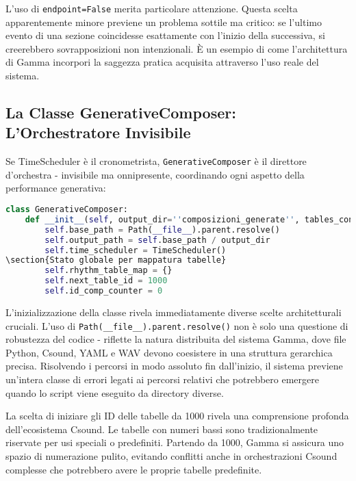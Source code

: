 L'uso di \texttt{endpoint=False} merita particolare attenzione. Questa scelta apparentemente minore previene un problema sottile ma critico: se l'ultimo evento di una sezione coincidesse esattamente con l'inizio della successiva, si creerebbero sovrapposizioni non intenzionali. È un esempio di come l'architettura di Gamma incorpori la saggezza pratica acquisita attraverso l'uso reale del sistema.
\subsection{La Classe GenerativeComposer: L'Orchestratore Invisibile}
Se TimeScheduler è il cronometrista, \texttt{GenerativeComposer} è il direttore d'orchestra - invisibile ma onnipresente, coordinando ogni aspetto della performance generativa:

\begin{lstlisting}[language=Python]
class GenerativeComposer:
    def __init__(self, output_dir=''composizioni_generate'', tables_config_path=''yaml/tables.yaml''):
        self.base_path = Path(__file__).parent.resolve()
        self.output_path = self.base_path / output_dir
        self.time_scheduler = TimeScheduler()
\section{Stato globale per mappatura tabelle}
        self.rhythm_table_map = {}
        self.next_table_id = 1000
        self.id_comp_counter = 0
\end{lstlisting}

L'inizializzazione della classe rivela immediatamente diverse scelte architetturali cruciali. L'uso di \texttt{Path(\_\_file\_\_).parent.resolve()} non è solo una questione di robustezza del codice - riflette la natura distribuita del sistema Gamma, dove file Python, Csound, YAML e WAV devono coesistere in una struttura gerarchica precisa. Risolvendo i percorsi in modo assoluto fin dall'inizio, il sistema previene un'intera classe di errori legati ai percorsi relativi che potrebbero emergere quando lo script viene eseguito da directory diverse.

La scelta di iniziare gli ID delle tabelle da 1000 rivela una comprensione profonda dell'ecosistema Csound. Le tabelle con numeri bassi sono tradizionalmente riservate per usi speciali o predefiniti. Partendo da 1000, Gamma si assicura uno spazio di numerazione pulito, evitando conflitti anche in orchestrazioni Csound complesse che potrebbero avere le proprie tabelle predefinite.

